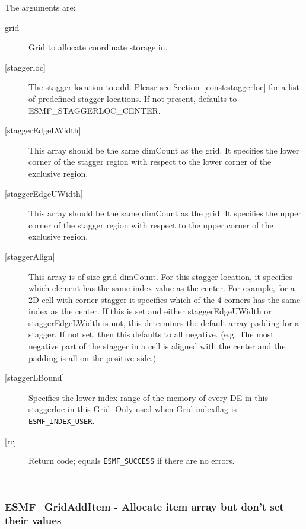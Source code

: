    The arguments are:
   \begin{description}
       \item[grid]
         Grid to allocate coordinate storage in.
   \item[{[staggerloc]}]
        The stagger location to add. Please see Section~\ref{const:staggerloc} for a list
        of predefined stagger locations. If not present, defaults to ESMF\_STAGGERLOC\_CENTER.
   \item[{[staggerEdgeLWidth]}]
        This array should be the same dimCount as the grid. It specifies the lower corner of the stagger
        region with respect to the lower corner of the exclusive region.
   \item[{[staggerEdgeUWidth]}]
        This array should be the same dimCount as the grid. It specifies the upper corner of the stagger
        region with respect to the upper corner of the exclusive region.
   \item[{[staggerAlign]}]
        This array is of size  grid dimCount.
        For this stagger location, it specifies which element
        has the same index value as the center. For example,
        for a 2D cell with corner stagger it specifies which
        of the 4 corners has the same index as the center.
        If this is set and either staggerEdgeUWidth or staggerEdgeLWidth is not,
        this determines the default array padding for a stagger.
        If not set, then this defaults to all negative. (e.g.
        The most negative part of the stagger in a cell is aligned with the
        center and the padding is all on the positive side.)
   \item[{[staggerLBound]}]
        Specifies the lower index range of the memory of every DE in this staggerloc in this Grid.
        Only used when Grid indexflag is {\tt ESMF\_INDEX\_USER}.
   \item[{[rc]}]
        Return code; equals {\tt ESMF\_SUCCESS} if there are no errors.
   \end{description}
   
 
\mbox{}\hrulefill\ 
 
\subsubsection [ESMF\_GridAddItem] {ESMF\_GridAddItem - Allocate item array but don't set their values}


